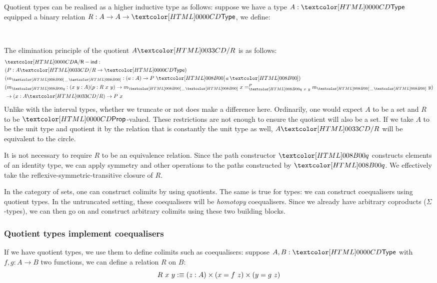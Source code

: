 Quotient types can be realised as a higher inductive type as follows:
suppose we have a type $A : \Type$ equipped a binary relation
$R : A \to A \to \Type$, we define:
%
\begin{datatype}{}{\Type}
   \\
\end{datatype}
%
The elimination principle of the quotient $\quotty{A}{R}$ is as
follows:
%
\begin{align*}
&\quotind{A}{R} : \\
&(P : \quotty{A}{R} \to \Type) \\
&(m_{\quotproj{\_}} : (a : A) \to P\ \quotproj{a}) \\
&(m_{\quoteq} : (x\ y : A) (p : R\ x\ y) \to \pathover{P}{\quoteq\ x\ y}{m_{\quotproj{\_}}\ x}{m_{\quotproj{\_}}\ y})\\
&\to (x : \quotty{A}{R}) \to P\ x
\end{align*}
%
Unlike with the interval types, whether we truncate or not does make a
difference here. Ordinarily, one would expect $A$ to be a set and $R$
to be $\Prop$-valued. These restrictions are not enough to ensure the
quotient will also be a set. If we take $A$ to be the unit type and
quotient it by the relation that is constantly the unit type as well,
$\quotty{A}{R}$ will be equivalent to the circle.

It is not necessary to require $R$ to be an equivalence
relation. Since the path constructor $\quoteq$ constructs elements of
an identity type, we can apply symmetry and other operations to the
paths constructed by $\quoteq$. We effectively take the
reflexive-symmetric-transitive closure of $R$.

In the category of sets, one can construct colimits by using
quotients. The same is true for types: we can construct coequalisers
using quotient types. In the untruncated setting, these coequalisers
will be \emph{homotopy} coequalisers. Since we already have arbitrary
coproducts ($\Sigma$-types), we can then go on and construct arbitrary
colimits using these two building blocks.

\subsubsection{Quotient types implement coequalisers}
If we have quotient types, we use them to define colimits such as
coequalisers: suppose $A, B : \Type$ with $f, g : A \to B$ two
functions, we can define a relation $R$ on $B$:
$$
R\ x\ y :\equiv (z : A) \times (x = f\ z) \times (y = g\ z)
$$

